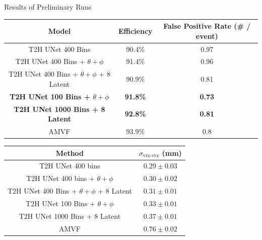 \documentclass[xcolor=table,aspectratio=169]{beamer}
\begin{document}
\begin{frame}{Results of Preliminary Runs}
    \centering
    \begin{tabular}{c c c}
        \hline
        Model & Efficiency & False Positive Rate (\# / event) \\
        \hline
        T2H UNet 400 Bins & 90.4\% & 0.97 \\
        T2H UNet 400 Bins + \(\theta + \phi\) & 91.4\% & 0.96 \\
        T2H UNet 400 Bins + \(\theta + \phi\) + 8 Latent & 90.9\% & 0.81 \\
        \textbf{T2H UNet 100 Bins + \(\theta + \phi\)} & \textbf{91.8\%} & \textbf{0.73} \\
        \textbf{T2H UNet 1000 Bins + 8 Latent} & \textbf{92.8\%} & \textbf{0.81} \\
        AMVF & 93.9\% & 0.8 \\
        \hline
    \end{tabular}

    \vspace{7pt}

    \begin{tabular}{c c}
        \hline
        Method & \(\sigma_{\text{vtx-vtx}}\) (mm) \\
        \hline
        T2H UNet 400 bins & \(0.29 \pm 0.03\) \\
        T2H UNet 400 bins + \(\theta + \phi\) & \(0.30 \pm 0.02\) \\
        T2H UNet 400 Bins + \(\theta + \phi\) + 8 Latent & \(0.31 \pm 0.01\) \\
        T2H UNet 100 Bins + \(\theta + \phi\) & \(0.33 \pm 0.01\) \\
        T2H UNet 1000 Bins + 8 Latent & \(0.37 \pm 0.01\) \\
        AMVF & \(0.76 \pm 0.02\) \\
        \hline
    \end{tabular}
\end{frame}
\end{document}
